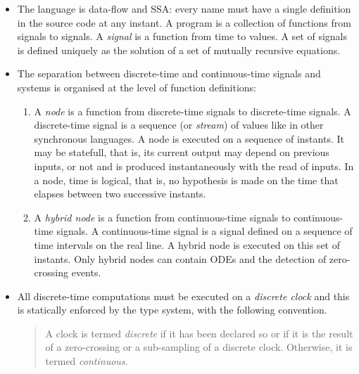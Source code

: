 \documentclass[11pt,titlepage,twoside]{report}
\newenvironment{flatitemize}
  {\begin{itemize}[leftmargin=*]}
  {\end{itemize}}
\newcommand{\zelus}{{\sf Z\'elus}}
\begin{document}
\begin{flatitemize}
\item
The language is data-flow and \ac{SSA}: every name must have a single 
definition in the source code at any instant. A program is a collection 
of functions from signals to signals. A \emph{signal} is a function from time
to values. A set of signals is defined uniquely as
the solution of a set of mutually recursive equations.
\item
  The separation between discrete-time and continuous-time signals and
  systems is organised at the level of function definitions:
  \begin{enumerate}
  \item
    A \emph{node} is a function from discrete-time signals to
    discrete-time signals. A discrete-time signal is a sequence (or
    \emph{stream}) of values like in other synchronous languages. A
    node is executed on a sequence of instants.
    It may be
    statefull, that is, its current output may depend on previous
    inputs, or not and is produced instantaneously with the read of inputs.
    In a node, time is logical, that is, no hypothesis is made on the time that elapses
    between two successive instants.
  \item
    A \emph{hybrid node} is a function from continuous-time signals to
    continuous-time signals. A continuous-time signal is a signal
    defined on a sequence of time intervals on the real
    line.
    A hybrid node is executed on this set of instants. Only hybrid nodes
    can contain \acp{ODE} and the detection of zero-crossing events.
  \end{enumerate}
\item
All
discrete-time computations must be executed on a \emph{discrete clock}
and this is statically enforced by the type system, with the following
convention.

\begin{quote}
A clock is termed \emph{discrete} if it has been declared so or if it is the 
result of a zero-crossing or a sub-sampling of a discrete clock. Otherwise, it
is termed \emph{continuous}.
\end{quote}


\end{flatitemize}
\end{document}
